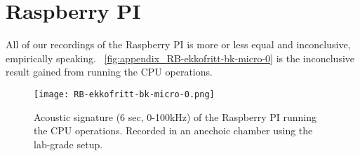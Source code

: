 
\section{Raspberry PI}\label{apx:sec:raspberry}
All of our recordings of the Raspberry PI is more or less equal and inconclusive, empirically speaking. 
~\autoref{fig:appendix_RB-ekkofritt-bk-micro-0} is the inconclusive result gained from running the CPU operations. 
\begin{figure}[ht]
    \centering
    \texttt{[image: RB-ekkofritt-bk-micro-0.png]}
    \caption{Acoustic signature (6 sec, 0-100kHz) of the Raspberry PI running the CPU operations.
        Recorded in an anechoic chamber using the lab-grade setup.}
    \label{fig:appendix_RB-ekkofritt-bk-micro-0}
\end{figure}